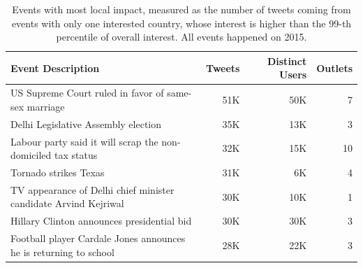 \begin{table}
\centering
{\footnotesize
\begin{tabularx}{\textwidth}{@{}lrrr@{}}
\toprule
Event Description                                                 & Tweets & Distinct Users & Outlets \\ \midrule
US Supreme Court ruled in favor of same-sex marriage              & 51K  & 50K          & 7                                    \\
Delhi Legislative Assembly election                               & 35K  & 13K          & 3                                  \\
Labour party said it will scrap the non-domiciled tax status      & 32K  & 15K          & 10                           \\
Tornado strikes Texas                                             & 31K  & 6K           & 4                                    \\
TV appearance of Delhi chief minister candidate Arvind Kejriwal   & 30K  & 10K          & 1                                    \\
Hillary Clinton announces presidential bid                        & 30K  & 30K          & 3                                     \\
Football player Cardale Jones announces he is returning to school & 28K  & 22K          & 3                                      \\ \bottomrule
\end{tabularx}
}
\caption[Events with most local impact]{Events with most local impact, measured as the number of tweets coming from events with only one interested country, whose interest is higher than the 99-th percentile of overall interest. All events happened on 2015.}\label{tab:impact_local}
\end{table}



